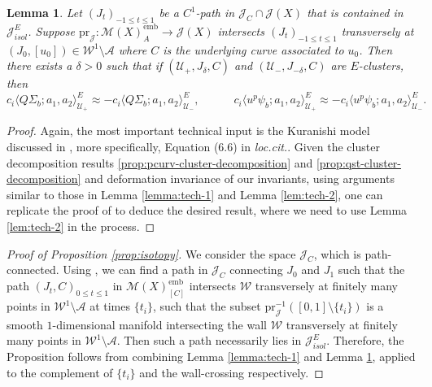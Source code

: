 \documentclass[reqno]{amsart}
\numberwithin{equation}{section}
\numberwithin{equation}{section}
\numberwithin{equation}{section}
\newtheorem{lemma}[thm]{Lemma}
\theoremstyle{definition}
\theoremstyle{remark}
\theoremstyle{remark}
\begin{document}
\begin{lemma}\label{lemma:tech-3}
    Let $(J_t)_{-1 \leq t \leq 1}$ be a $C^1$-path in $\mathcal{J}_C \cap \mathcal{J}(X)$ that is contained in $\mathcal{J}^E_{isol}$. Suppose $\mathrm{pr}_{\mathcal{J}}: \mathcal{M}(X)^{\mathrm{emb}}_A \to \mathcal{J}(X)$ intersects $(J_t)_{-1 \leq t \leq 1}$ transversely at $(J_0, [u_0]) \in \mathcal{W}^1 \setminus \mathcal{A}$ where $C$ is the underlying curve associated to $u_0$. Then there exists a $\delta > 0$ such that if $(\mathcal{U}_+, J_{\delta}, C)$ and $(\mathcal{U}_-, J_{-\delta}, C)$ are $E$-clusters, then
    \begin{equation}
        c_i \langle Q\Sigma_b ; a_1, a_2 \rangle^E_{\mathcal{U}_+} \approx - c_i \langle Q\Sigma_b ; a_1, a_2 \rangle^E_{\mathcal{U}_-}, \quad \quad \quad c_i \langle u^p \psi_b; a_1, a_2 \rangle^E_{\mathcal{U}_+}  \approx - c_i \langle u^p \psi_b; a_1, a_2 \rangle^E_{\mathcal{U}_-}.
    \end{equation}
\end{lemma}
\begin{proof}
    Again, the most important technical input is the Kuranishi model discussed in \cite[Corollary 6.3]{IP-GV}, more specifically, Equation (6.6) in \emph{loc.cit.}. Given the cluster decomposition results \cref{prop:pcurv-cluster-decomposition} and \cref{prop:qst-cluster-decomposition} and deformation invariance of our invariants, using arguments similar to those in Lemma \ref{lemma:tech-1} and Lemma \ref{lem:tech-2}, one can replicate the proof of \cite[Lemma 7.4]{IP-GV} to deduce the desired result, where we need to use Lemma \ref{lem:tech-2} in the process.
\end{proof}

\begin{proof}[Proof of Proposition \ref{prop:isotopy}]
    We consider the space $\mathcal{J}_C$, which is path-connected. Using \cite[Lemma 6.7]{IP-GV}, we can find a path in $\mathcal{J}_C$ connecting $J_0$ and $J_1$ such that the path $(J_t, C)_{0 \leq t \leq 1}$ in $\mathcal{M}(X)^{\mathrm{emb}}_{[C]}$ intersects $\mathcal{W}$ transversely at finitely many points in $\mathcal{W}^1 \setminus \mathcal{A}$ at times $\{t_i\}$, such that the subset $\mathrm{pr}_{\mathcal{J}}^{-1}([0,1] \setminus \{t_i\})$ is a smooth $1$-dimensional manifold intersecting the wall $\mathcal{W}$ transversely at finitely many points in $\mathcal{W}^1 \setminus \mathcal{A}$. Then such a path necessarily lies in $\mathcal{J}^E_{isol}$. Therefore, the Proposition follows from combining Lemma \ref{lemma:tech-1} and Lemma \ref{lemma:tech-3}, applied to the complement of $\{t_i\}$ and the wall-crossing respectively.
\end{proof}
\end{document}

